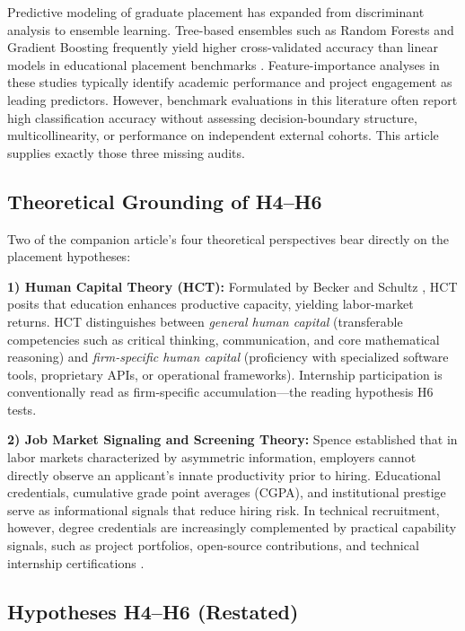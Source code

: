 \documentclass[journal]{IEEEtran}
\begin{document}
Predictive modeling of graduate placement has expanded from discriminant analysis to ensemble learning. Tree-based ensembles such as Random Forests and Gradient Boosting frequently yield higher cross-validated accuracy than linear models in educational placement benchmarks \cite{tamene2024predictive, haque2024classification}. Feature-importance analyses in these studies typically identify academic performance and project engagement as leading predictors. However, benchmark evaluations in this literature often report high classification accuracy without assessing decision-boundary structure, multicollinearity, or performance on independent external cohorts. This article supplies exactly those three missing audits.

\subsection{Theoretical Grounding of H4--H6}
\label{sec:theory_p}

Two of the companion article's four theoretical perspectives bear directly on the placement hypotheses:

\textbf{1) Human Capital Theory (HCT):} Formulated by Becker \cite{becker1964human} and Schultz \cite{schultz1961investment}, HCT posits that education enhances productive capacity, yielding labor-market returns. HCT distinguishes between \textit{general human capital} (transferable competencies such as critical thinking, communication, and core mathematical reasoning) and \textit{firm-specific human capital} (proficiency with specialized software tools, proprietary APIs, or operational frameworks). Internship participation is conventionally read as firm-specific accumulation---the reading hypothesis H6 tests.

\textbf{2) Job Market Signaling and Screening Theory:} Spence \cite{spence1973job} established that in labor markets characterized by asymmetric information, employers cannot directly observe an applicant's innate productivity prior to hiring. Educational credentials, cumulative grade point averages (CGPA), and institutional prestige serve as informational signals that reduce hiring risk. In technical recruitment, however, degree credentials are increasingly complemented by practical capability signals, such as project portfolios, open-source contributions, and technical internship certifications \cite{pianda2024impact, scandurra2024employability}.

\subsection{Hypotheses H4--H6 (Restated)}
\label{sec:hypotheses_p}
\end{document}
